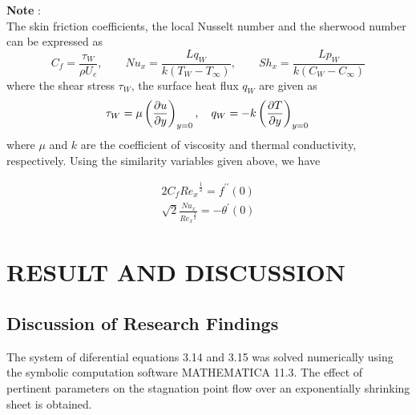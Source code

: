 \documentclass[a4paper,12pt]{report}
\begin{document}
{\textbf{Note} :\\
The skin friction coefficients, the local Nusselt number and the sherwood number can be expressed as
\[
C_f = \frac{\tau_W}{\rho U_e}, \qquad  Nu_x = \frac{L q_W}{k(T_W - T_{\infty})}, \qquad  Sh_x = \frac{L p_W}{k(C_W - C_{\infty})}
\]
where the shear stress $\tau_W$, the surface heat flux $q_W$ are given as
\[
\tau_W = \mu \left(  \frac{\partial u}{\partial y}  \right)_{y = 0}, \quad q_W = -k \left( \frac{\partial T}{\partial y} \right)_{y = 0}\quad\\
\]
where $\mu$ and $k$ are the coefficient of viscosity and thermal conductivity, respectively. Using the similarity variables given above, we have

\begin{eqnarray}
	2 C_f  {Re_x}^{\frac{1}{2}} = f^{\prime \prime}(0)\\
	\sqrt{2}\frac{Nu_x}{{Re_x}^{\frac{1}{2}}}  =  - \theta^\prime (0)
\end{eqnarray}

\chapter{RESULT AND DISCUSSION}
 

\section{Discussion of Research Findings}
\quad
The system of diferential equations 3.14 and 3.15 was solved numerically using the symbolic computation software MATHEMATICA 11.3. The effect of pertinent parameters on the stagnation point flow over an exponentially shrinking sheet is obtained.\\


}
\end{document}
